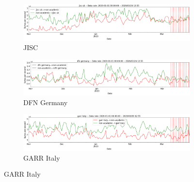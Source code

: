 \documentclass[10pt, journal, letterpaper]{IEEEtran}
\newcommand\linearFigSze{0.48}
\begin{document}
\begin{figure}
    \begin{subfigure}{\linearFigSze\textwidth}
          \centering
          \includegraphics[width=\columnwidth]{img/jisc_busi_bps.png}
          \caption{JISC}
          \label{fig:jisc_busi_bps}
    \end{subfigure}
    \begin{subfigure}{\linearFigSze\textwidth}
          \centering
          \includegraphics[width=\columnwidth]{img/dfn_busi_bps.png}
          \caption{DFN Germany}
          \label{fig:dfn_busi_bps}
    \end{subfigure}
    \begin{subfigure}{\linearFigSze\textwidth}
          \centering
          \includegraphics[width=\columnwidth]{img/garr_busi_bps.png}
          \caption{GARR Italy}
          \label{fig:garr_busi_bps}
    \end{subfigure}

\end{figure}
\end{document}
